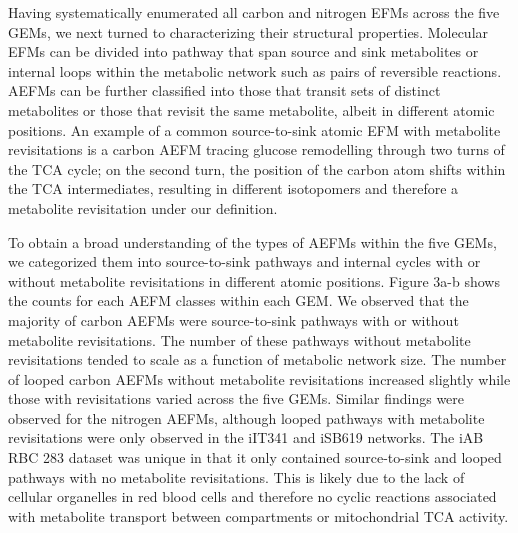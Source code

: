 \documentclass[12pt]{article}
\begin{document}
Having systematically enumerated all carbon and nitrogen EFMs across the five
GEMs, we next turned to characterizing their structural properties. Molecular
EFMs can be divided into pathway that span source and sink metabolites or
internal loops within the metabolic network such as pairs of reversible
reactions. AEFMs can be further classified into those that transit sets of
distinct metabolites or those that revisit the same metabolite, albeit in
different atomic positions. An example of a common source-to-sink atomic EFM
with metabolite revisitations is a carbon AEFM tracing glucose remodelling
through two turns of the TCA cycle; on the second turn, the position of the
carbon atom shifts within the TCA intermediates, resulting in different
isotopomers and therefore a metabolite revisitation under our definition.

To obtain a broad understanding of the types of AEFMs within the five GEMs, we
categorized them into source-to-sink pathways and internal cycles with or
without metabolite revisitations in different atomic positions. Figure
3a-b shows the counts for each AEFM classes within each GEM. We observed
that the majority of carbon AEFMs were source-to-sink pathways with or
without metabolite revisitations. The number of these pathways without
metabolite revisitations tended to scale as a function of metabolic
network size. The number of looped carbon AEFMs without metabolite
revisitations increased slightly while those with revisitations varied
across the five GEMs. Similar findings were observed for the nitrogen
AEFMs, although looped pathways with metabolite revisitations were only
observed in the iIT341 and iSB619 networks. The iAB RBC 283 dataset was
unique in that it only contained source-to-sink and looped pathways with
no metabolite revisitations. This is likely due to the lack of cellular
organelles in red blood cells and therefore no cyclic reactions associated
with metabolite transport between compartments or mitochondrial TCA
activity.
\end{document}

